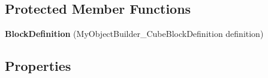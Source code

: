 \subsection*{Protected Member Functions}
\begin{DoxyCompactItemize}
\item 
\hypertarget{class_s_e_mod_a_p_i_1_1_a_p_i_1_1_definitions_1_1_cube_blocks_1_1_block_definition_ad823de9f318ed3f9a26ae04e6c554dbb}{}{\bfseries Block\+Definition} (My\+Object\+Builder\+\_\+\+Cube\+Block\+Definition definition)\label{class_s_e_mod_a_p_i_1_1_a_p_i_1_1_definitions_1_1_cube_blocks_1_1_block_definition_ad823de9f318ed3f9a26ae04e6c554dbb}

\end{DoxyCompactItemize}
\subsection*{Properties}
